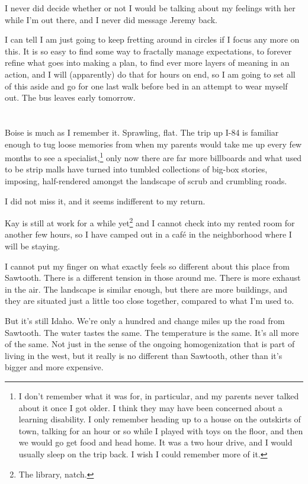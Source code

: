 I never did decide whether or not I would be talking about my feelings with her while I'm out there, and I never did message Jeremy back.

I can tell I am just going to keep fretting around in circles if I focus any more on this. It is so easy to find some way to fractally manage expectations, to forever refine what goes into making a plan, to find ever more layers of meaning in an action, and I will (apparently) do that for hours on end, so I am going to set all of this aside and go for one last walk before bed in an attempt to wear myself out. The bus leaves early tomorrow.

\section{}

Boise is much as I remember it. Sprawling, flat. The trip up I-84 is familiar enough to tug loose memories from when my parents would take me up every few months to see a specialist,\footnote{I don't remember what it was for, in particular, and my parents never talked about it once I got older. I think they may have been concerned about a learning disability. I only remember heading up to a house on the outskirts of town, talking for an hour or so while I played with toys on the floor, and then we would go get food and head home. It was a two hour drive, and I would usually sleep on the trip back. I wish I could remember more of it.} only now there are far more billboards and what used to be strip malls have turned into tumbled collections of big-box stories, imposing, half-rendered amongst the landscape of scrub and crumbling roads.

I did not miss it, and it seems indifferent to my return.

Kay is still at work for a while yet\footnote{The library, natch.} and I cannot check into my rented room for another few hours, so I have camped out in a café in the neighborhood where I will be staying.

I cannot put my finger on what exactly feels so different about this place from Sawtooth. There is a different tension in those around me. There is more exhaust in the air. The landscape is similar enough, but there are more buildings, and they are situated just a little too close together, compared to what I'm used to.

But it's still Idaho. We're only a hundred and change miles up the road from Sawtooth. The water tastes the same. The temperature is the same. It's all more of the same. Not just in the sense of the ongoing homogenization that is part of living in the west, but it really is no different than Sawtooth, other than it's bigger and more expensive.

